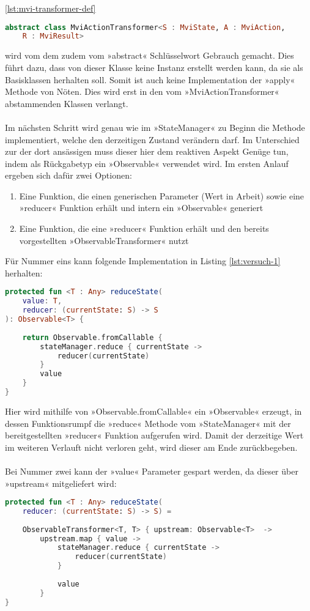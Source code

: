 \ref{lst:mvi-transformer-def}
\begin{lstlisting}[caption={MviActionTransformer Definition}, label={lst:mvi-transformer-def},
language=Kotlin]
abstract class MviActionTransformer<S : MviState, A : MviAction, 
	R : MviResult> 
\end{lstlisting}
\bigskip
wird vom dem zudem vom »abstract« Schlüsselwort Gebrauch gemacht. Dies führt dazu, dass von dieser Klasse keine Instanz erstellt werden kann, da sie als Basisklassen herhalten soll. Somit ist auch keine Implementation der »apply« Methode von Nöten. Dies wird erst in den vom »MviActionTransformer« abstammenden Klassen verlangt.
\\\\
Im nächsten Schritt wird genau wie im »StateManager« zu Beginn die Methode implementiert, welche den derzeitigen Zustand verändern darf. Im Unterschied zur der dort ansässigen muss dieser hier dem reaktiven Aspekt Genüge tun, indem als Rückgabetyp ein »Observable« verwendet wird. Im ersten Anlauf ergeben sich dafür zwei Optionen:
\begin{enumerate}
	\item Eine Funktion, die einen generischen Parameter  (Wert in Arbeit) sowie eine »reducer« Funktion erhält und intern ein »Observable« generiert
	\item Eine Funktion, die eine »reducer« Funktion erhält und den bereits vorgestellten »ObservableTransformer« nutzt
\end{enumerate}
Für Nummer eins kann folgende Implementation in Listing
\ref{lst:versuch-1}
herhalten:
\begin{lstlisting}[caption={1. Versuch}, label={lst:versuch-1},language=Kotlin]
protected fun <T : Any> reduceState(
	value: T, 
	reducer: (currentState: S) -> S
): Observable<T> {
	
	return Observable.fromCallable {
		stateManager.reduce { currentState ->
			reducer(currentState)
		}
		value
	}
}
\end{lstlisting}
Hier wird mithilfe von »Observable.fromCallable« ein »Observable« erzeugt, in dessen Funktionsrumpf die »reduce« Methode vom »StateManager«  mit der bereitgestellten »reducer« Funktion aufgerufen wird. Damit der derzeitige Wert im weiteren Verlauft nicht verloren geht, wird dieser am Ende zurückbegeben.
\\\\
Bei Nummer zwei kann der »value« Parameter gespart werden, da dieser über »upstream« mitgeliefert wird:
\begin{lstlisting}[caption={2. Versuch}, label={lst:versuch-2},language=Kotlin]
protected fun <T : Any> reduceState(
	reducer: (currentState: S) -> S) =
	
	ObservableTransformer<T, T> { upstream: Observable<T>  ->
		upstream.map { value ->
			stateManager.reduce { currentState ->
				reducer(currentState)
			}
		
			value
		}
}
\end{lstlisting}
